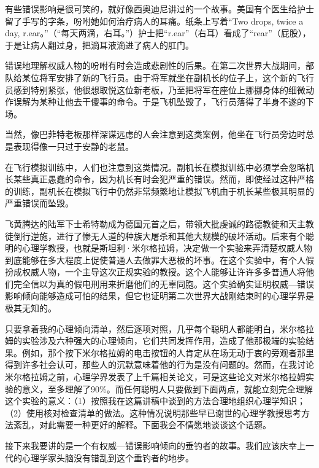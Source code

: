 有些错误影响是很可笑的，就好像西奥迪尼讲过的一个故事。美国有个医生给护士留了手写的字条，吩咐她如何治疗病人的耳痛。纸条上写着“Two drops, twice a day, r.ear。”（“每天两滴，右耳。”）护士把“r.ear”（右耳）看成了“rear”（屁股），于是让病人翻过身，把滴耳液滴进了病人的肛门。
\par

错误地理解权威人物的吩咐有时会造成悲剧性的后果。在第二次世界大战期间，部队给某位将军安排了新的飞行员。由于将军就坐在副机长的位子上，这个新的飞行员感到特别紧张，他很想取悦这位新老板，乃至把将军在座位上挪挪身体的细微动作误解为某种让他去干傻事的命令。于是飞机坠毁了，飞行员落得了半身不遂的下场。
\par

当然，像巴菲特老板那样深谋远虑的人会注意到这类案例，他坐在飞行员旁边时总是表现得像一只过于安静的老鼠。
\par

在飞行模拟训练中，人们也注意到这类情况。副机长在模拟训练中必须学会忽略机长某些真正愚蠢的命令，因为机长有时会犯严重的错误。然而，即使经过这种严格的训练，副机长在模拟飞行中仍然非常频繁地让模拟飞机由于机长某些极其明显的严重错误而坠毁。
\par

飞黄腾达的陆军下士希特勒成为德国元首之后，带领大批虔诚的路德教徒和天主教徒倒行逆施，进行了惨无人道的种族大屠杀和其他大规模的破坏活动。后来有个聪明的心理学教授，也就是斯坦利·米尔格拉姆，决定做一个实验来弄清楚权威人物到底能够在多大程度上促使普通人去做罪大恶极的坏事。在这个实验中，有个人假扮成权威人物，一个主导这次正规实验的教授。这个人能够让许许多多普通人将他们完全信以为真的假电刑用来折磨他们的无辜同胞。这个实验确实证明权威—错误影响倾向能够造成可怕的结果，但它也证明第二次世界大战刚结束时的心理学界是极其无知的。
\par

只要拿着我的心理倾向清单，然后逐项对照，几乎每个聪明人都能明白，米尔格拉姆的实验涉及六种强大的心理倾向，它们共同发挥作用，造成了他那极端的实验结果。例如，那个按下米尔格拉姆的电击按钮的人肯定从在场无动于衷的旁观者那里得到许多社会认可，那些人的沉默意味着他的行为是没有问题的。然而，在我讨论米尔格拉姆之前，心理学界发表了上千篇相关论文，可是这些论文对米尔格拉姆实验的意义，至多理解了90\%。而任何聪明人只要做到下面两点，就能立刻完全理解这个实验的意义：（1）按照我在这篇讲稿中谈到的方法合理地组织心理学知识；（2）使用核对检查清单的做法。这种情况说明那些早已谢世的心理学教授思考方法紊乱，对此需要一种更好的解释。下面我会不情愿地谈谈这个话题。
\par

接下来我要讲的是一个有权威—错误影响倾向的垂钓者的故事。我们应该庆幸上一代的心理学家头脑没有错乱到这个垂钓者的地步。
\par

